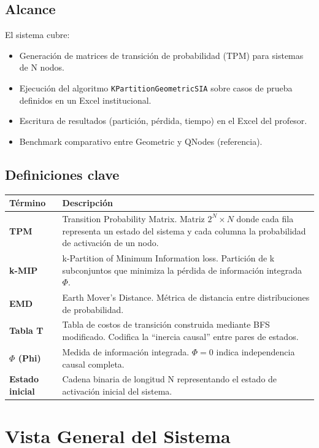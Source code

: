 \documentclass[12pt,a4paper]{article}
\begin{document}
\subsection{Alcance}
El sistema cubre:
\begin{itemize}
    \item Generación de matrices de transición de probabilidad (TPM) para sistemas de N nodos.
    \item Ejecución del algoritmo \texttt{KPartitionGeometricSIA} sobre casos de prueba definidos en un Excel institucional.
    \item Escritura de resultados (partición, pérdida, tiempo) en el Excel del profesor.
    \item Benchmark comparativo entre Geometric y QNodes (referencia).
\end{itemize}

\subsection{Definiciones clave}
\begin{longtable}{>{\bfseries}p{3.5cm} p{10cm}}
    \toprule
    Término & Descripción \\
    \midrule
    \endhead
    TPM & Transition Probability Matrix. Matriz $2^N \times N$ donde cada fila representa un estado del sistema y cada columna la probabilidad de activación de un nodo. \\
    k-MIP & k-Partition of Minimum Information loss. Partición de k subconjuntos que minimiza la pérdida de información integrada $\Phi$. \\
    EMD & Earth Mover's Distance. Métrica de distancia entre distribuciones de probabilidad. \\
    Tabla T & Tabla de costos de transición construida mediante BFS modificado. Codifica la ``inercia causal'' entre pares de estados. \\
    $\Phi$ (Phi) & Medida de información integrada. $\Phi = 0$ indica independencia causal completa. \\
    Estado inicial & Cadena binaria de longitud N representando el estado de activación inicial del sistema. \\
    \bottomrule
\end{longtable}

\section{Vista General del Sistema}
\end{document}
